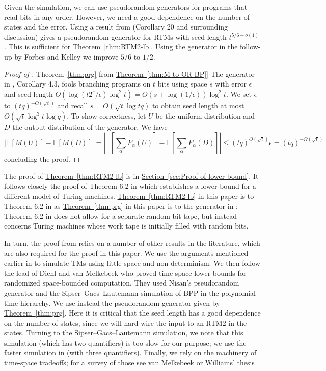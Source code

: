 \documentclass[11pt]{article}
\numberwithin{equation}{section}
\theoremstyle{definition}
\theoremstyle{plain}
\newcommand{\expref}[2]{\hyperref[#2]{#1~\ref{#2}}}
\newcommand{\E}{\mathbb{E}}
\newcommand{\eps}{\epsilon}
\begin{document}
\medskip

Given the simulation, we can use pseudorandom generators for programs
that read bits in any order. However, we need a good dependence on
the number of states and the error. Using a result from \cite{HLV-bipnfp}
(Corollary 20 and surrounding discussion) gives a pseudorandom generator
for RTMs with seed length $t^{5/6+o(1)}$. This is sufficient for
\expref{Theorem}{thm:RTM2-lb}. Using the generator in the follow-up by
Forbes and Kelley \cite{ForbesKelley-2018} we improve $5/6$ to $1/2$.

%
%
%
%
%
%
%
\begin{proof}[Proof of \expref{Theorem}{thm:prg} from
  \expref{Theorem}{thm:M-to-OR-BP}]  %
The generator in \cite{ForbesKelley-2018}, Corollary 4.3, fools branching
programs on $t$ bits using space $s$ with error $\eps$ and seed length
$O(\log(t2^{s}/\eps)\log^{2}t)=O(s+\log(1/\eps))\log^{2}t$. We set $\eps$
to $(tq)^{-O(\sqrt{t})}$ and recall $s=O(\sqrt{t}\log tq)$ to obtain
seed length at most $O(\sqrt{t}\log^{3}t\log q)$. To show correctness,
let $U$ be the uniform distribution and $D$ the output distribution
of the generator. We have
%
%
\[
\left|\E[M(U)]-\E[M(D)]\right|=
\left|\E\left[\sum_{\alpha}P_{\alpha}(U)\right]-
\E\left[\sum_{\alpha}P_{\alpha}(D)\right]\right|\le(tq)^{O(\sqrt{t})}\eps
%
=(tq)^{-\Omega(\sqrt{t})}   %
\]
concluding the proof.
%
%
%
%
\end{proof}
%
The proof of \expref{Theorem}{thm:RTM2-lb} is in \expref{Section}{sec:Proof-of-lower-bound}.
It follows closely the proof of Theorem 6.2 in \cite{ViolaBPvsE}
which establishes a lower bound for a different model of Turing machines.
\expref{Theorem}{thm:RTM2-lb} in this paper is to Theorem 6.2 in \cite{ViolaBPvsE}
as \expref{Theorem}{thm:prg} in this paper is to the generator in \cite{INW94}:
Theorem 6.2 in \cite{ViolaBPvsE} does not allow for a separate random-bit
tape, but instead concerns Turing machines whose work tape is initially
filled with random bits.

In turn, the proof from \cite{ViolaBPvsE} relies on a number of other
results in the literature, which are also required for the proof in
this paper. We use the arguments mentioned earlier in \cite{MaS87,DBLP:journals/tcs/MelkebeekR05}
to simulate TMs using little space and non-determinism. We then follow
the lead of Diehl and van Melkebeek \cite{DvM06} who proved time-space
lower bounds for randomized space-bounded computation. They used Nisan's
pseudorandom generator \cite{Nis92} and the Sipser--Gacs--Lautemann
\cite{Sip83b,Lau83} simulation of BPP in the polynomial-time hierarchy.
We use instead the pseudorandom generator given by \expref{Theorem}{thm:prg}.
Here it is critical that the seed length has a good dependence on
the number of states, since we will hard-wire the input to an RTM2
in the states. Turning to the Sipser--Gacs--Lautemann simulation, we
note that this simulation (which has two quantifiers) is too slow
for our purpose; we use the faster simulation in \cite{ViolaBPvsE}
(with three quantifiers). Finally, we rely on the machinery of time-space
tradeoffs; for a survey of those see van Melkebeek \cite{Melkebeek06}
or Williams' thesis \cite{Williams07}.
\end{document}
